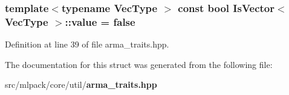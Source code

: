 \subsubsection[{value}]{\setlength{\rightskip}{0pt plus 5cm}template$<$typename Vec\-Type $>$ const bool {\bf Is\-Vector}$<$ Vec\-Type $>$\-::value = false\hspace{0.3cm}{\ttfamily [static]}}\label{structIsVector_a5ec0c1366b298b7200906b0772831f45}


Definition at line 39 of file arma\-\_\-traits.\-hpp.



The documentation for this struct was generated from the following file\-:\begin{DoxyCompactItemize}
\item 
src/mlpack/core/util/{\bf arma\-\_\-traits.\-hpp}\end{DoxyCompactItemize}
